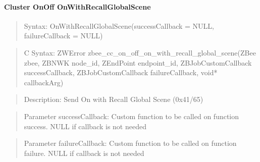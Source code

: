 \paragraph{Cluster OnOff OnWithRecallGlobalScene}
\begin{quote}Syntax: OnWithRecallGlobalScene(successCallback = NULL, failureCallback = NULL)\end{quote}
\begin{quote}C Syntax: ZWError zbee\_cc\_on\_off\_on\_with\_recall\_global\_scene(ZBee zbee, ZBNWK node\_id, ZEndPoint endpoint\_id, ZBJobCustomCallback successCallback, ZBJobCustomCallback failureCallback, void* callbackArg)\end{quote}
\begin{quote}Description: Send On with Recall Global Scene (0x41/65)\end{quote}
\begin{quote}Parameter successCallback: Custom function to be called on function success. NULL if callback is not needed\end{quote}
\begin{quote}Parameter failureCallback: Custom function to be called on function failure. NULL if callback is not needed\end{quote}


